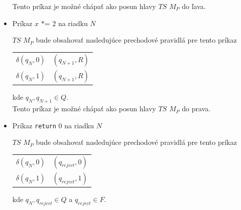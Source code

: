 \documentclass[11pt,a4paper]{article}
\begin{document}
\begin{itemize}
\begin{flushright}
\begin{minipage}{0.90\textwidth}
            Tento príkaz je možné chápať ako posun hlavy $TS$ $M_P$ do ľava.
        \end{minipage}
        \end{flushright}
    \item Príkaz $x \texttt{ *= } 2$ na riadku $N$\\[-1.5em]
        \begin{flushright}
        \begin{minipage}{0.90\textwidth}
            $TS$ $M_P$ bude obsahovať nasledujúce prechodové pravidlá pre tento príkaz
            \begin{center}
            \begin{tabular}{r@{ $=$ }l}
                $\delta(q_{N}, 0)$ & $(q_{N+1}, R)$\\
                $\delta(q_{N}, 1)$ & $(q_{N+1}, R)$
            \end{tabular}
            \end{center}
            kde $q_{N}, q_{N+1} \in Q$.\\

            Tento príkaz je možné chápať ako posun hlavy $TS$ $M_P$ do prava.
        \end{minipage}
        \end{flushright}
    \item Príkaz \texttt{return} $0$ na riadku $N$\\[-1.5em]
        \begin{flushright}
        \begin{minipage}{0.90\textwidth}
            $TS$ $M_P$ bude obsahovať nasledujúce prechodové pravidlá pre tento príkaz
            \begin{center}
            \begin{tabular}{r@{ $=$ }l}
                $\delta(q_{N}, 0)$ & $(q_{reject}, 0)$\\
                $\delta(q_{N}, 1)$ & $(q_{reject}, 1)$
            \end{tabular}
            \end{center}
            kde $q_{N}, q_{reject} \in Q$ a $q_{reject} \in F$.\\


\end{minipage}
\end{flushright}
\end{itemize}
\end{document}

